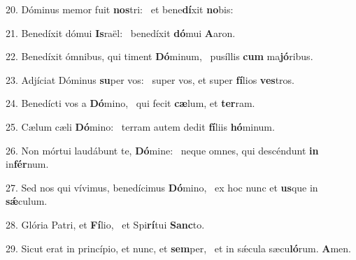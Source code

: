 20. Dóminus memor fuit \textbf{nos}tri: \ast\  et bene\textbf{dí}xit \textbf{no}bis:\

21. Benedíxit dómui \textbf{Is}raël: \ast\  benedíxit \textbf{dó}mui \textbf{A}aron.\

22. Benedíxit ómnibus, qui timent \textbf{Dó}minum, \ast\  pusíllis \textbf{cum} ma\textbf{jó}ribus.\

23. Adjíciat Dóminus \textbf{su}per vos: \ast\  super vos, et super \textbf{fí}lios \textbf{ves}tros.\

24. Benedícti vos a \textbf{Dó}mino, \ast\  qui fecit \textbf{cæ}lum, et \textbf{ter}ram.\

25. Cælum cæli \textbf{Dó}mino: \ast\  terram autem dedit \textbf{fí}liis \textbf{hó}minum.\

26. Non mórtui laudábunt te, \textbf{Dó}mine: \ast\  neque omnes, qui descéndunt \textbf{in} in\textbf{fér}num.\

27. Sed nos qui vívimus, benedícimus \textbf{Dó}mino, \ast\  ex hoc nunc et \textbf{us}que in \textbf{sǽ}culum.\

28. Glória Patri, et \textbf{Fí}lio, \ast\  et Spi\textbf{rí}tui \textbf{Sanc}to.\

29. Sicut erat in princípio, et nunc, et \textbf{sem}per, \ast\  et in sǽcula sæcu\textbf{ló}rum. \textbf{A}men.\

